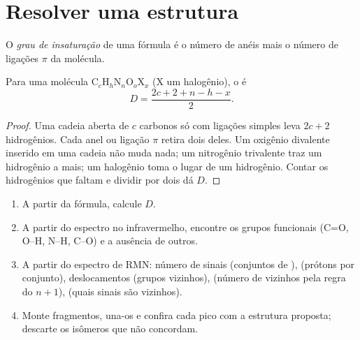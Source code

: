 \section{Resolver uma estrutura}

\begin{definition}\label{def:b1:structure-spectroscopy:unsaturation}
O \emph{grau de insaturação} de uma fórmula
é o número de anéis mais o número de ligações $\pi$ da molécula.
\end{definition}

\begin{proposition}\label{prop:b1:structure-spectroscopy:unsaturation-formula}
Para uma molécula $\mathrm{C}_c\mathrm{H}_h\mathrm{N}_n\mathrm{O}_o\mathrm{X}_x$
(X um halogênio), o  é
\[
  D = \frac{2c + 2 + n - h - x}{2} .
\]
\end{proposition}

\begin{proof}
Uma cadeia aberta de $c$ carbonos só com ligações simples leva $2c + 2$
hidrogênios. Cada anel ou ligação $\pi$ retira dois deles. Um oxigênio
divalente inserido em uma cadeia não muda nada; um nitrogênio trivalente
traz um hidrogênio a mais; um halogênio toma o lugar de um hidrogênio.
Contar os hidrogênios que faltam e dividir por dois dá $D$.
\end{proof}

\begin{method}\label{met:b1:structure-spectroscopy:solve-structure}
\begin{enumerate}
  \item A partir da fórmula, calcule $D$.
  \item A partir do espectro no infravermelho, encontre os grupos
        funcionais (C=O, O--H, N--H, C--O) e a ausência de outros.
  \item A partir do espectro de RMN: número de sinais (conjuntos de
        ),  (prótons por conjunto),
        deslocamentos (grupos vizinhos),  (número de
        vizinhos pela regra do $n + 1$),  (quais
        sinais são vizinhos).
  \item Monte fragmentos, una-os e confira cada pico com a estrutura
        proposta; descarte os isômeros que não concordam.
\end{enumerate}
\end{method}

